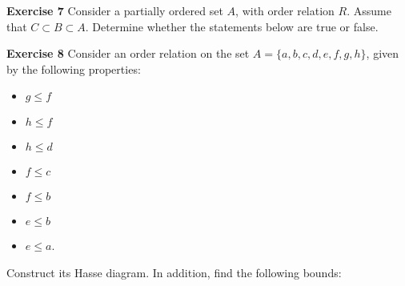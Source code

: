 \documentclass[12pt,oneside]{exam}
\newenvironment{exercise}[1]{\vspace{.1in}\noindent\textbf{Exercise #1 \hspace{.05em}}}{}
\begin{document}
\begin{exercise}{7}
Consider a partially ordered set $A$, with order relation $R$. Assume that $C \subset B \subset A$. Determine whether the statements below are true or false.
\end{exercise}

\begin{exercise}{8}
Consider an order relation on the set $A=\{a,b,c,d,e,f,g,h\}$, given by the following properties: 
\begin{itemize}
\item $g \leq  f$
\item $h \leq f$
\item $h \leq d$
\item $f \leq c$
\item $f \leq b$
\item $e \leq b$
\item $e \leq a$.
\end{itemize}

Construct its Hasse diagram. In addition, find the following bounds:
\end{exercise}
\end{document}
